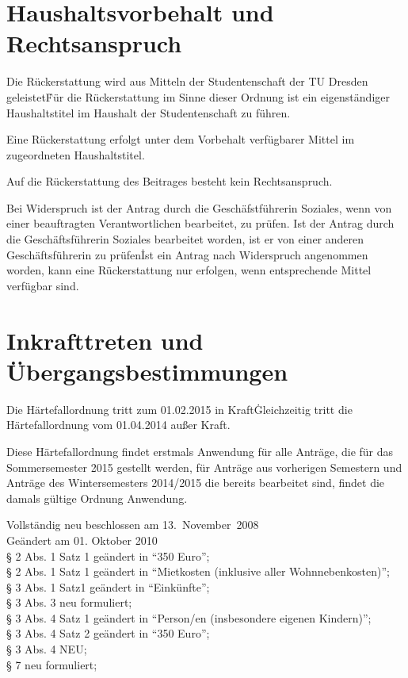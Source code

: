 \begin{multicols}{2}
\section{Haushaltsvorbehalt und Rechtsanspruch}
\Abs \Satz Die Rückerstattung wird aus Mitteln der Studentenschaft der TU Dresden geleistet\. Für die Rückerstattung im Sinne dieser Ordnung ist ein eigenständiger Haushaltstitel im Haushalt der Studentenschaft zu führen.

\Abs \Satz Eine Rückerstattung erfolgt unter dem Vorbehalt verfügbarer Mittel im zugeordneten Haushaltstitel.

\Abs \Satz Auf die Rückerstattung des Beitrages besteht kein Rechtsanspruch.

\Abs \Satz Bei Widerspruch ist der Antrag durch die Geschäfstführerin Soziales, wenn von einer beauftragten Verantwortlichen bearbeitet, zu prüfen. Ist der Antrag durch die Geschäftsführerin Soziales bearbeitet worden, ist er von einer anderen Geschäftsführerin zu prüfen\.
Ist ein Antrag nach Widerspruch angenommen worden, kann eine Rückerstattung nur erfolgen, wenn entsprechende Mittel verfügbar sind.


\section{Inkrafttreten und Übergangsbestimmungen}
\Abs \Satz Die Härtefallordnung tritt zum 01.02.2015 in Kraft\. Gleichzeitig tritt die Härtefallordnung vom 01.04.2014 außer Kraft.

\Abs \Satz Diese Härtefallordnung findet erstmals Anwendung für alle Anträge, die für das Sommersemester 2015 gestellt werden, für Anträge aus vorherigen Semestern und Anträge des Wintersemesters 2014/2015 die bereits bearbeitet sind, findet die damals gültige Ordnung Anwendung.

\end{multicols}

\nopagebreak
\vspace{1cm}



\footnotesize

Vollständig neu beschlossen am 13.~November~2008\\

Geändert am 01. Oktober 2010 \\
§ 2 Abs. 1 Satz 1 geändert in "`350 Euro"'; \\
§ 2 Abs. 1 Satz 1 geändert in "`Mietkosten (inklusive aller Wohnnebenkosten)"'; \\
§ 3 Abs. 1 Satz1 geändert in "`Einkünfte"'; \\
§ 3 Abs. 3 neu formuliert; \\
§ 3 Abs. 4 Satz 1 geändert in "`Person/en (insbesondere eigenen Kindern)"'; \\
§ 3 Abs. 4 Satz 2 geändert in "`350 Euro"'; \\
§ 3 Abs. 4 NEU; \\
§ 7 neu formuliert; \\

